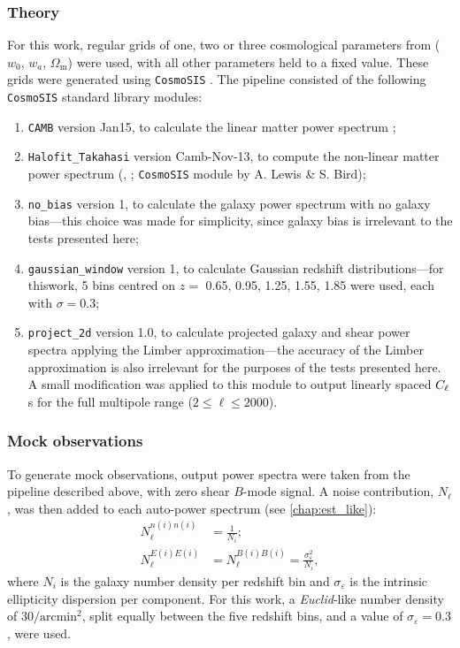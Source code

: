 \subsubsection{Theory}
\label{gl_Sec:fs_method_theory}

For this work, regular grids of one, two or three cosmological parameters from ($w_0$, $w_a$, $\Omega_\text{m}$) were used, with all other parameters held to a fixed value. These grids were generated using \texttt{CosmoSIS} \citep{Zuntz2015}. The pipeline consisted of the following \texttt{CosmoSIS} standard library modules:
\begin{enumerate}
\item \texttt{CAMB} version Jan15, to calculate the linear matter power spectrum \citep{Lewis2000, Howlett2012};
\item \texttt{Halofit\_Takahasi} version Camb-Nov-13, to compute the non-linear matter power spectrum (\citealt{Smith2003}, \citealt{Takahashi2012}; \texttt{CosmoSIS} module by A. Lewis \& S. Bird);
\item \texttt{no\_bias} version 1, to calculate the galaxy power spectrum with no galaxy bias---this choice was made for simplicity, since galaxy bias is irrelevant to the tests presented here;
\item \texttt{gaussian\_window} version 1, to calculate Gaussian redshift distributions---for this\linebreak work, 5 bins centred on $z =$ 0.65, 0.95, 1.25, 1.55, 1.85 were used, each with $\sigma = 0.3$;
\item \texttt{project\_2d} version 1.0, to calculate projected galaxy and shear power spectra applying the Limber approximation---the accuracy of the Limber approximation is also irrelevant for the purposes of the tests presented here. A small modification was applied to this module to output linearly spaced $C_\ell$s for the full multipole range ($2 \leq \ell \leq 2000$).
\end{enumerate}

\subsubsection{Mock observations}
\label{gl_Sec:fs_method_obs}

To generate mock observations, output power spectra were taken from the pipeline described above, with zero shear $B$-mode signal. A noise contribution, $N_\ell$, was then added to each auto-power spectrum (see \autoref{chap:est_like}):
\begin{align}
\label{gl_Eqn:nl_start}
N_\ell^{n(i)n(i)} &= \frac{1}{N_i}; \\
N_\ell^{E(i)E(i)} &=
N_\ell^{B(i)B(i)} = \frac{\sigma_\varepsilon^2}{N_i},
\label{gl_Eqn:nl_end}
\end{align}
where $N_i$ is the galaxy number density per redshift bin and $\sigma_\varepsilon$ is the intrinsic ellipticity dispersion per component. For this work, a \textit{Euclid}-like number density of $30 / \text{arcmin}^2$, split equally between the five redshift bins, and a value of $\sigma_\varepsilon = 0.3$, were used.

